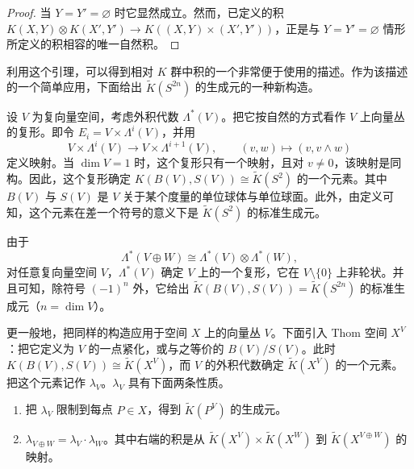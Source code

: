 \begin{proof}
  当 $Y=Y'=\varnothing$ 时它显然成立。然而，已定义的积 $K(X,Y)\otimes K(X',Y')\to K((X,Y)\times(X',Y'))$，正是与 $Y=Y'=\varnothing$ 情形所定义的积相容的唯一自然积。
\end{proof}

利用这个引理，可以得到相对 $K$ 群中积的一个非常便于使用的描述。作为该描述的一个简单应用，下面给出 $\tilde K(S^{2n})$ 的生成元的一种新构造。

设 $V$ 为复向量空间，考虑外积代数 $\Lambda^*(V)$。把它按自然的方式看作 $V$ 上向量丛的复形。即令 $E_i=V\times\Lambda^i(V)$，并用
\[
V\times\Lambda^i(V)\longrightarrow V\times\Lambda^{i+1}(V),\qquad
(v,w)\longmapsto(v,v\wedge w)
\]
定义映射。当 $\dim V=1$ 时，这个复形只有一个映射，且对 $v\ne0$，该映射是同构。因此，这个复形确定 $K(B(V),S(V))\cong\tilde K(S^2)$ 的一个元素。其中 $B(V)$ 与 $S(V)$ 是 $V$ 关于某个度量的单位球体与单位球面。此外，由定义可知，这个元素在差一个符号的意义下是 $\tilde K(S^2)$ 的标准生成元。


由于
\[
\Lambda^*(V\oplus W)\cong\Lambda^*(V)\otimes\Lambda^*(W),
\]
对任意复向量空间 $V$，$\Lambda^*(V)$ 确定 $V$ 上的一个复形，它在 $V\setminus\{0\}$ 上非轮状。并且可知，除符号 $(-1)^n$ 外，它给出 $\tilde K(B(V),S(V))=\tilde K(S^{2n})$ 的标准生成元（$n=\dim V$）。

更一般地，把同样的构造应用于空间 $X$ 上的向量丛 $V$。下面引入 Thom 空间 $X^V$：把它定义为 $V$ 的一点紧化，或与之等价的 $B(V)/S(V)$。此时 $K(B(V),S(V))\cong\tilde K(X^V)$，而 $V$ 的外积代数确定 $\tilde K(X^V)$ 的一个元素。把这个元素记作 $\lambda_V$。$\lambda_V$ 具有下面两条性质。

\begin{enumerate}[label=(\Alph*),leftmargin=2.2em,itemsep=2pt]
\item 把 $\lambda_V$ 限制到每点 $P\in X$，得到 $\tilde K(P^V)$ 的生成元。
\item $\lambda_{V\oplus W}=\lambda_V\cdot\lambda_W$。其中右端的积是从 $\tilde K(X^V)\times\tilde K(X^W)$ 到 $\tilde K(X^{V\oplus W})$ 的映射。
\end{enumerate}


